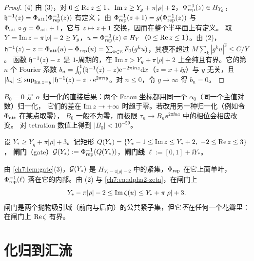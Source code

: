 \begin{proof}
(4) 由 (3)，对 $0\le\operatorname{Re} z\le1$、$\operatorname{Im} z\ge Y_g+\pi|\rho|+2$，$\Phi_{\mathrm{rep}}^{-1}(z)\in H_{Y_g}$，$\mathfrak h^{-1}(z)=\Phi_{\mathrm{att}}(\Phi_{\mathrm{rep}}^{-1}(z))$ 有定义；
由 $\Phi_{\mathrm{rep}}^{-1}(z+1)=g(\Phi_{\mathrm{rep}}^{-1}(z))$ 与 $\Phi_{\mathrm{att}}\circ g=\Phi_{\mathrm{att}}+1$，它与 $z\mapsto z+1$ 交换，因而在整个半平面上有定义。
取 $Y=\operatorname{Im} z-\pi|\rho|-2\ge Y_g$，$u=\Phi_{\mathrm{rep}}^{-1}(z)\in H_Y$（$0\le\operatorname{Re} z\le1$）。由 (2)，
$\mathfrak h^{-1}(z)-z=\Phi_{\mathrm{att}}(u)-\Phi_{\mathrm{rep}}(u)=\sum_{k\in\mathbb{Z}}F_0(g^ku)$，其模不超过 $M\sum_k|g^ku|^2\le C/Y$。
函数 $\mathfrak h^{-1}(z)-z$ 是 $1$-周期的，在 $\operatorname{Im} z>Y_g+\pi|\rho|+2$ 上全纯且有界。它的第 $n$ 个 Fourier 系数
$b_n=\int_0^1(\mathfrak h^{-1}(z)-z)\mathrm{e}^{-2\pi\mathrm{i} nz}\mathrm{d} x$（$z=x+\ii y$）与 $y$ 无关，且
$|b_n|\le\sup_{\operatorname{Im} z=y}|\mathfrak h^{-1}(z)-z|\cdot\mathrm{e}^{2\pi ny}$。对 $n\le0$，令 $y\to\infty$ 得 $b_n=0$。
\end{proof}

\begin{remark}\label{ch7:rem:B0}
$B_0=0$ 是 $\alpha$ 归一化的直接后果：两个 Fatou 坐标都用同一个 $\alpha_0$（同一个主值对数）归一化，
它们的差在 $\operatorname{Im} z\to+\infty$ 时趋于零。若改用另一种归一化（例如令 $\Phi_{\mathrm{att}}$ 在某点取零），
$B_0$ 一般不为零，而极限 $\tau_n\to B_n\ee^{2\pi\ii na}$ 中的相位会相应改变。
\cite{KneserPaper} 对 tetration 数值上得到 $|B_0|<10^{-59}$。
\end{remark}

\begin{definition}[闸门]\label{ch7:def:gate}
设 $Y_*\ge Y_g+\pi|\rho|+3$。记矩形 $Q(Y_*)=\{Y_*-1\le\operatorname{Im} z\le Y_*+2,\ -2\le\operatorname{Re} z\le3\}$，
\textbf{闸门}（gate）$\mathcal G(Y_*):=\Phi_{\mathrm{rep}}^{-1}(Q(Y_*))$，\textbf{闸门线} $\ell:=[0,1]+\ii Y_*$。
\end{definition}

由 \cref{ch7:lem:gate}(3)，$\mathcal G(Y_*)$ 是 $H_{Y_*-\pi|\rho|-2}$ 中的紧集，$\Phi_{\mathrm{rep}}$ 在它上面单叶，
$\Phi_{\mathrm{rep}}^{-1}(\ell)$ 落在它的内部。由 (2) 与 \eqref{ch7:eq:alpha2-zeta}，在闸门上
\begin{equation}\label{ch7:eq:gate-height}
 Y_*-\pi|\rho|-2\le\operatorname{Im}\zeta(u)\le Y_*+\pi|\rho|+3 .
\end{equation}
闸门是两个抛物吸引域（前向与后向）的公共紧子集，但它\emph{不}在任何一个花瓣里：
在闸门上 $\operatorname{Re}\zeta$ 有界。

\section{化归到汇流}\label{ch7:sec:reduction}

